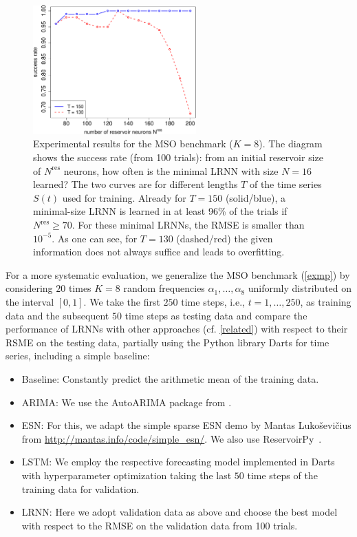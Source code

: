 \documentclass[preprint,12pt,times,authoryear]{elsarticle}%
\theoremstyle{definition}
\begin{document}
\begin{figure}
  \centering
  \includegraphics[width=0.56\textwidth]{fig/mso8}%
  \caption{Experimental results for the MSO benchmark ($K=8$). The diagram shows the
	success rate (from 100 trials): from an initial reservoir size of $N^\mathrm{res}$
	neurons, how often is the minimal LRNN with size
	$N=16$ learned? The two curves are for different lengths $T$ of the time series
	$S(t)$ used for training. Already for $T=150$ (solid/blue), a
	minimal-size LRNN is learned in at least 96\% of the trials if
	$N^\mathrm{res} \ge 70$. For these minimal LRNNs, the RMSE is smaller
	than $10^{-5}$. As one can see, for $T=130$ (dashed/red) the given
	information does not always suffice and leads to overfitting.}
  \label{mso8}
\end{figure}

For a more systematic evaluation, we generalize the MSO benchmark (\cref{exmp})
by considering $20$ times $K=8$ random frequencies $\alpha_1,\dots,\alpha_8$
uniformly distributed on the interval $[0,1]$. We take the first $250$ time
steps, i.e., $t=1,\dots,250$, as training data and the subsequent $50$ time
steps as testing data and compare the performance of LRNNs with other approaches
(cf. \cref{related}) with respect to their RSME on the testing data, partially
using the Python library Darts \citep[see also \url{http://unit8co.github.io/darts/}]{HLPN+22}  for
time series, including a simple baseline:

\begin{itemize}
  \item Baseline: Constantly predict the arithmetic mean of the training data.
  \item ARIMA: We use the AutoARIMA package from \citet{HK08}.
  \item ESN: For this, we adapt the simple sparse ESN demo by Mantas
	Luko\v{s}evi\v{c}ius from \url{http://mantas.info/code/simple_esn/}.
	We also use ReservoirPy~\citep{TPDH20}.
  \item LSTM: We employ the respective forecasting model implemented in Darts
	with hyperparameter optimization taking the last $50$ time steps of the
	training data for validation.
  \item LRNN: Here we adopt validation data as above and choose the best model
	with respect to the RMSE on the validation data from 100 trials.
\end{itemize}
\end{document}
